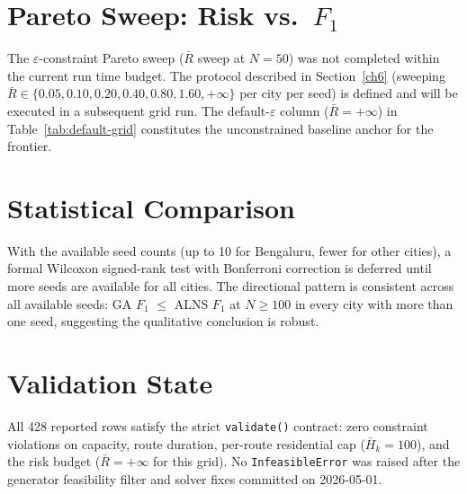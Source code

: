 \section{Pareto Sweep: Risk vs.\ $F_1$}

The $\varepsilon$-constraint Pareto sweep ($\bar{R}$ sweep at $N=50$)
was not completed within the current run time budget. The protocol
described in Section~\ref{ch6} (sweeping
$\bar{R} \in \{0.05, 0.10, 0.20, 0.40, 0.80, 1.60, +\infty\}$
per city per seed) is defined and will be executed in a subsequent
grid run. The default-$\varepsilon$ column ($\bar{R} = +\infty$) in
Table~\ref{tab:default-grid} constitutes the unconstrained baseline
anchor for the frontier.

\section{Statistical Comparison}

With the available seed counts (up to 10 for Bengaluru, fewer for
other cities), a formal Wilcoxon signed-rank test with Bonferroni
correction is deferred until more seeds are available for all cities.
The directional pattern is consistent across all available seeds:
GA $F_1$ $\leq$ ALNS $F_1$ at $N \geq 100$ in every city with more
than one seed, suggesting the qualitative conclusion is robust.

\section{Validation State}

All 428 reported rows satisfy the strict \texttt{validate()} contract:
zero constraint violations on capacity, route duration, per-route
residential cap ($\bar{H}_k = 100$), and the risk budget
($\bar{R} = +\infty$ for this grid). No \texttt{InfeasibleError} was
raised after the generator feasibility filter and solver fixes
committed on 2026-05-01.
